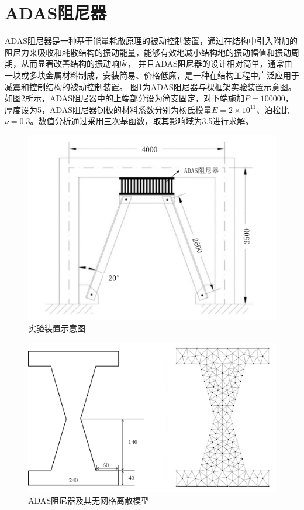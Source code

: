 \section{ADAS阻尼器}
ADAS阻尼器是一种基于能量耗散原理的被动控制装置，通过在结构中引入附加的阻尼力来吸收和耗散结构的振动能量，能够有效地减小结构地的振动幅值和振动周期，从而显著改善结构的振动响应，
并且ADAS阻尼器的设计相对简单，通常由一块或多块金属材料制成，安装简易、价格低廉，是一种在结构工程中广泛应用于减震和控制结构的被动控制装置。
图\ref{ADAS1}为ADAS阻尼器与裸框架实验装置示意图。
如图\ref{ADASmsh}所示，ADAS阻尼器中的上端部分设为简支固定，对下端施加$P=100000$，厚度设为5，ADAS阻尼器钢板的材料系数分别为杨氏模量$E=2\times 10^{11}$、泊松比$\nu=0.3$。数值分析通过采用三次基函数，取其影响域为3.5进行求解。
\begin{figure}[H]
    \centering
    \includegraphics[scale=0.6]{figure/DAMPER/ADAS/1.png}
    \caption{实验装置示意图\cite{basu2016}}\label{ADAS1}
\end{figure}
\begin{figure}[H]
    \centering
    \includegraphics[scale=0.5]{figure/DAMPER/ADAS/ADAS damper_msh.png}
    \caption{ADAS阻尼器及其无网格离散模型}\label{ADASmsh}
\end{figure}

